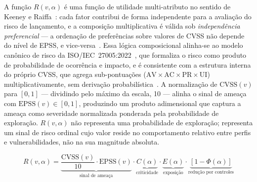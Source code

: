 

A função $R(v, \alpha)$ é uma função de utilidade multi-atributo no sentido
de Keeney e Raiffa~\cite{keeney1993}: cada fator contribui de forma
independente para a avaliação do risco de lançamento, e a composição
multiplicativa é válida sob \emph{independência preferencial} — a ordenação
de preferências sobre valores de CVSS não depende do nível de EPSS, e
vice-versa~\cite{keeney1993}. Essa lógica composicional alinha-se ao modelo
canônico de risco da ISO/IEC~27005:2022~\cite{iso27005}, que formaliza o
risco como produto de probabilidade de ocorrência e impacto, e é consistente
com a estrutura interna do próprio CVSS, que agrega sub-pontuações
($\text{AV} \times \text{AC} \times \text{PR} \times \text{UI}$)
multiplicativamente, sem derivação probabilística~\cite{mell2007}. A
normalização de $\text{CVSS}(v)$ para $[0,1]$ — dividindo pelo máximo da
escala, 10 — alinha o sinal de ameaça com $\text{EPSS}(v) \in [0,1]$,
produzindo um produto adimensional que captura a ameaça como severidade
normalizada ponderada pela probabilidade de exploração. $R(v, \alpha)$ não
representa uma probabilidade de exploração; representa um sinal de risco
ordinal cujo valor reside no comportamento relativo entre perfis e
vulnerabilidades, não na sua magnitude absoluta.

\begin{equation}
  R(v, \alpha) =
  \underbrace{\frac{\text{CVSS}(v)}{10} \cdot \text{EPSS}(v)}_{\text{sinal de ameaça}}
  \cdot \underbrace{C(\alpha)}_{\text{criticidade}}
  \cdot \underbrace{E(\alpha)}_{\text{exposição}}
  \cdot \underbrace{[1 - \Phi(\alpha)]}_{\text{redução por controles}}
  \label{eq:scoring}
\end{equation}


